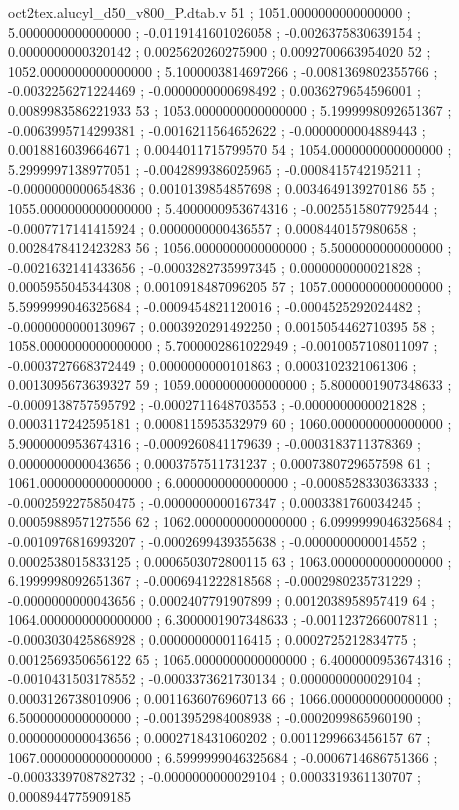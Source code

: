\begin{filecontents}[overwrite]{oct2tex.alucyl_d50_v800_P.dtab.v}
51 ; 1051.0000000000000000 ; 5.0000000000000000 ; -0.0119141601026058 ; -0.0026375830639154 ; 0.0000000000320142 ; 0.0025620260275900 ; 0.0092700663954020
52 ; 1052.0000000000000000 ; 5.1000003814697266 ; -0.0081369802355766 ; -0.0032256271224469 ; -0.0000000000698492 ; 0.0036279654596001 ; 0.0089983586221933
53 ; 1053.0000000000000000 ; 5.1999998092651367 ; -0.0063995714299381 ; -0.0016211564652622 ; -0.0000000004889443 ; 0.0018816039664671 ; 0.0044011715799570
54 ; 1054.0000000000000000 ; 5.2999997138977051 ; -0.0042899386025965 ; -0.0008415742195211 ; -0.0000000000654836 ; 0.0010139854857698 ; 0.0034649139270186
55 ; 1055.0000000000000000 ; 5.4000000953674316 ; -0.0025515807792544 ; -0.0007717141415924 ; 0.0000000000436557 ; 0.0008440157980658 ; 0.0028478412423283
56 ; 1056.0000000000000000 ; 5.5000000000000000 ; -0.0021632141433656 ; -0.0003282735997345 ; 0.0000000000021828 ; 0.0005955045344308 ; 0.0010918487096205
57 ; 1057.0000000000000000 ; 5.5999999046325684 ; -0.0009454821120016 ; -0.0004525292024482 ; -0.0000000000130967 ; 0.0003920291492250 ; 0.0015054462710395
58 ; 1058.0000000000000000 ; 5.7000002861022949 ; -0.0010057108011097 ; -0.0003727668372449 ; 0.0000000000101863 ; 0.0003102321061306 ; 0.0013095673639327
59 ; 1059.0000000000000000 ; 5.8000001907348633 ; -0.0009138757595792 ; -0.0002711648703553 ; -0.0000000000021828 ; 0.0003117242595181 ; 0.0008115953532979
60 ; 1060.0000000000000000 ; 5.9000000953674316 ; -0.0009260841179639 ; -0.0003183711378369 ; 0.0000000000043656 ; 0.0003757511731237 ; 0.0007380729657598
61 ; 1061.0000000000000000 ; 6.0000000000000000 ; -0.0008528330363333 ; -0.0002592275850475 ; -0.0000000000167347 ; 0.0003381760034245 ; 0.0005988957127556
62 ; 1062.0000000000000000 ; 6.0999999046325684 ; -0.0010976816993207 ; -0.0002699439355638 ; -0.0000000000014552 ; 0.0002538015833125 ; 0.0006503072800115
63 ; 1063.0000000000000000 ; 6.1999998092651367 ; -0.0006941222818568 ; -0.0002980235731229 ; -0.0000000000043656 ; 0.0002407791907899 ; 0.0012038958957419
64 ; 1064.0000000000000000 ; 6.3000001907348633 ; -0.0011237266007811 ; -0.0003030425868928 ; 0.0000000000116415 ; 0.0002725212834775 ; 0.0012569350656122
65 ; 1065.0000000000000000 ; 6.4000000953674316 ; -0.0010431503178552 ; -0.0003373621730134 ; 0.0000000000029104 ; 0.0003126738010906 ; 0.0011636076960713
66 ; 1066.0000000000000000 ; 6.5000000000000000 ; -0.0013952984008938 ; -0.0002099865960190 ; 0.0000000000043656 ; 0.0002718431060202 ; 0.0011299663456157
67 ; 1067.0000000000000000 ; 6.5999999046325684 ; -0.0006714686751366 ; -0.0003339708782732 ; -0.0000000000029104 ; 0.0003319361130707 ; 0.0008944775909185

\end{filecontents}
